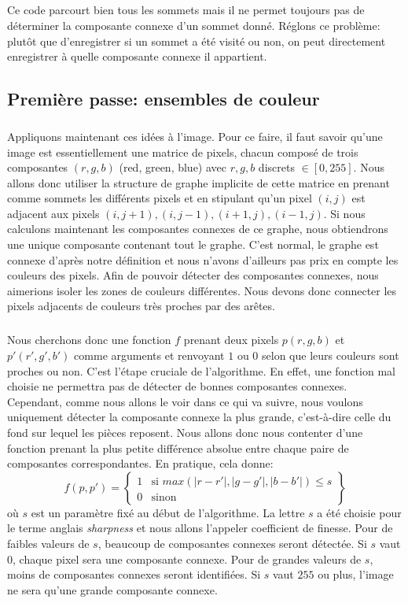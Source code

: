 \subparagraph{}
Ce code parcourt bien tous les sommets mais il ne permet toujours pas de déterminer la composante connexe d'un sommet donné. Réglons ce problème: plutôt que d'enregistrer si un sommet a été visité ou non, on peut directement enregistrer à quelle composante connexe il appartient.



\subsection{Première passe: ensembles de couleur}
\subparagraph{}
Appliquons maintenant ces idées à l'image. Pour ce faire, il faut savoir qu'une image est essentiellement une matrice de pixels, chacun composé de trois composantes $(r, g, b)$ (red, green, blue) avec $r, g, b$ discrets $\in [0, 255]$. Nous allons donc utiliser la structure de graphe implicite de cette matrice en prenant comme sommets les différents pixels et en stipulant qu'un pixel $(i, j)$ est adjacent aux pixels ${(i, j+1), (i, j-1), (i+1, j), (i-1, j)}$. Si nous calculons maintenant les composantes connexes de ce graphe, nous obtiendrons une unique composante contenant tout le graphe. C'est normal, le graphe est connexe d'après notre définition et nous n'avons d'ailleurs pas prix en compte les couleurs des pixels. Afin de pouvoir détecter des composantes connexes, nous aimerions isoler les zones de couleurs différentes. Nous devons donc connecter les pixels adjacents de couleurs très proches par des arêtes.

\subparagraph{}
Nous cherchons donc une fonction $f$ prenant deux pixels $p (r, g, b)$ et $p' (r', g', b')$ comme arguments et renvoyant $1$ ou $0$ selon que leurs couleurs sont proches ou non. C'est l'étape cruciale de l'algorithme. En effet, une fonction mal choisie ne permettra pas de détecter de bonnes composantes connexes. Cependant, comme nous allons le voir dans ce qui va suivre, nous voulons uniquement détecter la composante connexe la plus grande, c'est-à-dire celle du fond sur lequel les pièces reposent. Nous allons donc nous contenter d'une fonction prenant la plus petite différence absolue entre chaque paire de composantes correspondantes. En pratique, cela donne:
$$f(p, p') = \left\{\begin{array}{ll} 1 & \text{si } max(|r-r'|, |g-g'|, |b-b'|) \le s \\ 0 & \text{sinon}\end{array}\right\}$$
où $s$ est un paramètre fixé au début de l'algorithme. La lettre $s$ a été choisie pour le terme anglais \textit{sharpness} et nous allons l'appeler coefficient de finesse. Pour de faibles valeurs de $s$, beaucoup de composantes connexes seront détectée. Si $s$ vaut $0$, chaque pixel sera une composante connexe. Pour de grandes valeurs de $s$, moins de composantes connexes seront identifiées. Si $s$ vaut $255$ ou plus, l'image ne sera qu'une grande composante connexe.

